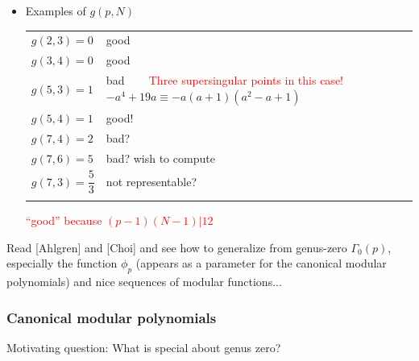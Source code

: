 \documentclass{rs}
\theoremstyle{definition}
\theoremstyle{remark}
\newcommand{\G}{\Gamma}
\renewcommand{\=}{\approx}
\renewcommand{\-}{\sim}
\newcommand{\rd}[1]{\textcolor{red}{#1}}
\numberwithin{equation}{section}
\numberwithin{thm}{section}
\begin{document}
\begin{enumerate}[(i)]
\begin{itemize}
  \item Examples of $g(p,N)$ 
  \begin{center}
   \begin{tabular}{ll}
    $g(2,3) = 0$ & \qquad good \\
    $g(3,4) = 0$ & \qquad good \\
    $g(5,3) = 1$ & \qquad bad ~~~ \rd{Three supersingular points in this case!} $-a^4 + 19 a \equiv -a (a + 1) (a^2 - a + 1)$ \\
    $g(5,4) = 1$ & \qquad good! \\
    $g(7,4) = 2$ & \qquad bad? \\
    $g(7,6) = 5$ & \qquad bad? wish to compute \\
    $g(7,3) = \dfrac{5}{3}$ & \qquad not representable? \\\\
   \end{tabular}

   \rd{``good'' because $(p - 1) (N - 1) | 12$} 
  \end{center}
 \end{itemize}
\end{enumerate}

Read [Ahlgren] and [Choi] and see how to generalize from genus-zero $\G_0(p)$, 
especially the function $\phi_p$ (appears as a parameter for the canonical modular polynomials) and nice sequences of modular functions...  


\subsubsection{Canonical modular polynomials}
\label{subsubsec:cmp}

Motivating question: What is special about genus zero?  
\end{document}
